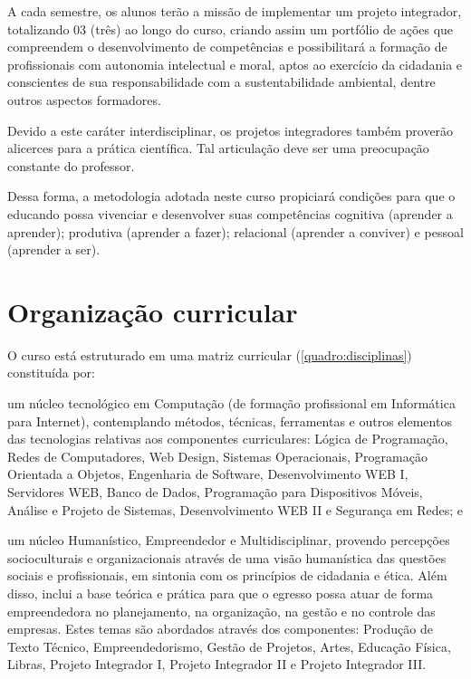 \documentclass[
	12pt,				%
	openright,			%
	twoside,			%
	a4paper,			%
	chapter=TITLE,		%
	english,			%
	french,				%
	spanish,			%
	brazil,				%
	]{abntex2}
\begin{document}
A cada semestre, os alunos terão a missão de implementar um projeto integrador, totalizando 03 (três) ao longo do curso, criando assim um portfólio de ações que compreendem o desenvolvimento de competências e possibilitará a formação de profissionais com autonomia intelectual e moral, aptos ao exercício da cidadania e conscientes de sua responsabilidade com a sustentabilidade ambiental, dentre outros aspectos formadores. 

Devido a este caráter interdisciplinar, os projetos integradores também proverão alicerces para a prática científica. Tal articulação deve ser uma preocupação constante do professor. %


Dessa forma, a metodologia adotada neste curso propiciará condições para que o educando possa vivenciar e desenvolver suas competências cognitiva (aprender a aprender); produtiva (aprender a fazer); relacional (aprender a conviver) e pessoal (aprender a ser).



\chapter{Organização curricular} 

O curso está estruturado em uma matriz curricular (\autoref{quadro:disciplinas}) constituída por:
\begin{alineas}
	\item um núcleo tecnológico em Computação (de formação profissional em Informática para Internet), contemplando métodos, técnicas, ferramentas e outros elementos das tecnologias relativas aos componentes curriculares:  Lógica de Programação, Redes de Computadores, Web Design, Sistemas Operacionais, Programação Orientada a Objetos, Engenharia de Software, Desenvolvimento WEB I, Servidores WEB, Banco de Dados, Programação para Dispositivos Móveis, Análise e Projeto de Sistemas, Desenvolvimento WEB II e Segurança em Redes; e 
	\item um núcleo Humanístico, Empreendedor e Multidisciplinar, provendo percepções socioculturais e organizacionais através de uma visão humanística das questões sociais e profissionais, em sintonia com os princípios de cidadania e ética.  Além disso, inclui a base teórica e prática para que o egresso possa atuar de forma empreendedora no planejamento, na organização, na gestão e no controle das empresas. Estes temas são abordados através dos componentes: {Produção de Texto Técnico,  Empreendedorismo, Gestão de Projetos, Artes, Educação Física, Libras}, Projeto Integrador I, Projeto Integrador II e Projeto Integrador III.

\end{alineas}
\end{document}
